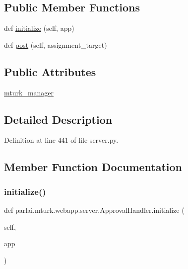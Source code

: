 \subsection*{Public Member Functions}
\begin{DoxyCompactItemize}
\item 
def \hyperlink{classparlai_1_1mturk_1_1webapp_1_1server_1_1ApprovalHandler_a3891a2146e72565874f18385dfc2c11e}{initialize} (self, app)
\item 
def \hyperlink{classparlai_1_1mturk_1_1webapp_1_1server_1_1ApprovalHandler_a94b2c2a69732dde8ea1e92a8b4f5f7ea}{post} (self, assignment\+\_\+target)
\end{DoxyCompactItemize}
\subsection*{Public Attributes}
\begin{DoxyCompactItemize}
\item 
\hyperlink{classparlai_1_1mturk_1_1webapp_1_1server_1_1ApprovalHandler_ac6cbcc9f89912ecbd3b9c677e44225b1}{mturk\+\_\+manager}
\end{DoxyCompactItemize}


\subsection{Detailed Description}


Definition at line 441 of file server.\+py.



\subsection{Member Function Documentation}
\mbox{\label{classparlai_1_1mturk_1_1webapp_1_1server_1_1ApprovalHandler_a3891a2146e72565874f18385dfc2c11e}} 
\subsubsection{\texorpdfstring{initialize()}{initialize()}}
{\footnotesize\ttfamily def parlai.\+mturk.\+webapp.\+server.\+Approval\+Handler.\+initialize (\begin{DoxyParamCaption}\item[{}]{self,  }\item[{}]{app }\end{DoxyParamCaption})}



